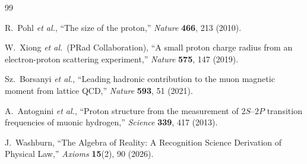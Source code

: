 \documentclass[12pt,a4paper]{article}
\theoremstyle{definition}
\theoremstyle{remark}
\begin{document}
\begin{thebibliography}{99}

R.~Pohl \textit{et al.}, ``The size of the proton,'' \textit{Nature}
\textbf{466}, 213 (2010).

W.~Xiong \textit{et al.}\ (PRad Collaboration), ``A small proton charge
radius from an electron-proton scattering experiment,'' \textit{Nature}
\textbf{575}, 147 (2019).

Sz.~Borsanyi \textit{et al.}, ``Leading hadronic contribution to the
muon magnetic moment from lattice QCD,'' \textit{Nature} \textbf{593},
51 (2021).

A.~Antognini \textit{et al.}, ``Proton structure from the measurement
of $2S$--$2P$ transition frequencies of muonic hydrogen,'' \textit{Science}
\textbf{339}, 417 (2013).

J.~Washburn, ``The Algebra of Reality: A Recognition Science Derivation
of Physical Law,'' \textit{Axioms} \textbf{15}(2), 90 (2026).

\end{thebibliography}
\end{document}

